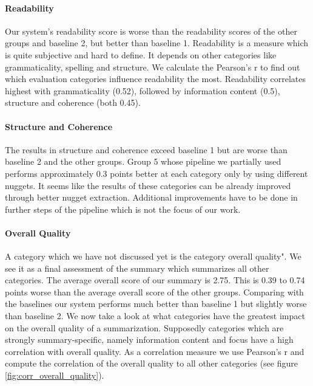 \paragraph{Readability}
Our system's readability score is worse than the readability scores of the other groups and baseline 2, but better than baseline 1. Readability is a measure which is quite subjective and hard to define. It depends on other categories like grammaticality, spelling and structure. We calculate the Pearson's r to find out which evaluation categories influence readability the most. Readability correlates highest with grammaticality (0.52), followed by information content (0.5), structure and coherence (both 0.45).   

\paragraph{Structure and Coherence}
The results in structure and coherence exceed baseline 1 but are worse than baseline 2 and the other groups. Group 5 whose pipeline we partially used performs approximately 0.3 points better at each category only by using different nuggets. It seems like the results of these categories can be already improved through better nugget extraction. Additional improvements have to be done in further steps of the pipeline which is not the focus of our work.

\paragraph{Overall Quality}
A category which we have not discussed yet is the category overall quality". We see it as a final assessment of the summary which summarizes all other categories. The average overall score of our summary is 2.75. This is 0.39 to 0.74 points worse than the average overall score of the other groups. Comparing with the baselines our system performs much better than baseline 1 but slightly worse than baseline 2. We now take a look at what categories have the greatest impact on the overall quality of a summarization. Supposedly categories which are strongly summary-specific, namely information content and focus have a high correlation with overall quality. As a correlation measure we use Pearson's r and compute the correlation of the overall quality to all other categories (see figure \ref{fig:corr_overall_quality}).

